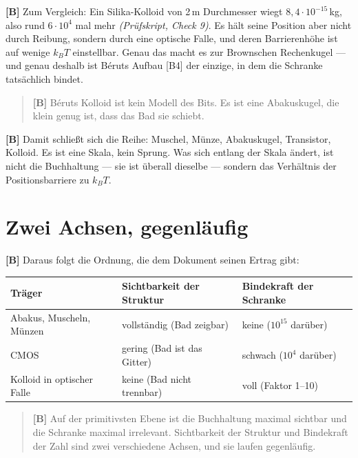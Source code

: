 \textbf{[B]} Zum Vergleich: Ein Silika-Kolloid von 2\,\textmu m Durchmesser wiegt
$8{,}4\cdot10^{-15}$\,kg, also rund $6\cdot10^{4}$ mal mehr \emph{(Prüfskript, Check 9)}. Es
hält seine Position aber nicht durch Reibung, sondern durch eine optische Falle,
und deren Barrierenhöhe ist auf wenige $k_BT$ einstellbar. Genau das macht es zur
Brownschen Rechenkugel --- und genau deshalb ist Béruts Aufbau [B4] der einzige,
in dem die Schranke tatsächlich bindet.

\begin{quote}
\textbf{[B]} Béruts Kolloid ist kein Modell des Bits. Es ist eine Abakuskugel, die klein
genug ist, dass das Bad sie schiebt.
\end{quote}

\textbf{[B]} Damit schließt sich die Reihe: Muschel, Münze, Abakuskugel, Transistor,
Kolloid. Es ist eine Skala, kein Sprung. Was sich entlang der Skala ändert, ist
nicht die Buchhaltung --- sie ist überall dieselbe --- sondern das Verhältnis der
Positionsbarriere zu $k_BT$.

\section{Zwei Achsen, gegenläufig}

\textbf{[B]} Daraus folgt die Ordnung, die dem Dokument seinen Ertrag gibt:

\begin{center}
\small
\begin{tabular}{@{}lll@{}}
\toprule
\textbf{Träger} & \textbf{Sichtbarkeit der Struktur} & \textbf{Bindekraft der Schranke} \\
\midrule
Abakus, Muscheln, Münzen & vollständig (Bad zeigbar) & keine ($10^{15}$ darüber) \\
CMOS & gering (Bad ist das Gitter) & schwach ($10^{4}$ darüber) \\
Kolloid in optischer Falle & keine (Bad nicht trennbar) & voll (Faktor 1--10) \\
\bottomrule
\end{tabular}
\end{center}

\begin{quote}
\textbf{[B]} Auf der primitivsten Ebene ist die Buchhaltung maximal sichtbar und die
Schranke maximal irrelevant. Sichtbarkeit der Struktur und Bindekraft der Zahl
sind zwei verschiedene Achsen, und sie laufen gegenläufig.
\end{quote}

